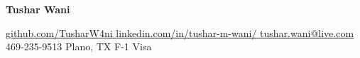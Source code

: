 \documentclass[letterpaper,11pt]{article}
\begin{document}

\begin{center}
    \textbf{\Huge Tushar Wani} \\ \vspace{2pt}

    \small \href{https://github.com/TusharW4ni}{\faGithub \hspace{1pt} {github.com/TusharW4ni} \hspace{1pt}}
    \small \href{https://www.linkedin.com/in/tushar-m-wani/}{\faLinkedin \hspace{1pt} {linkedin.com/in/tushar-m-wani/} \hspace{1pt}}
    \small \href{mailto:tushar.wani@live.com}{\faEnvelope \hspace{1pt} {tushar.wani@live.com} \hspace{1pt}}
    \small \faMobile \hspace{0pt} 469-235-9513 \hspace{1pt}
    \small \faMapMarker \hspace{0pt} Plano, TX \hspace{1pt}
    \small \faMapPin \hspace{0pt} F-1 Visa
\end{center}
\end{document}
